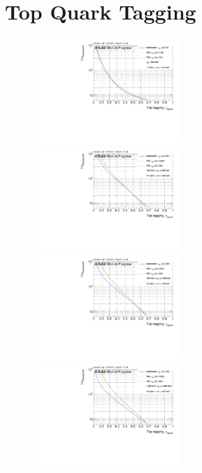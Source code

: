 \section{Top Quark Tagging}
\begin{figure}
\includegraphics[width=0.5\textwidth]{sascha_input/Appendix/Top_best/ROC_ALL_h_recoJet_nSub32_2_bin1.pdf} \hspace{1mm}
\includegraphics[width=0.5\textwidth]{sascha_input/Appendix/Top_best/ROC_ALL_h_recoJet_nSub32_2_bin2.pdf}
\bigskip
\includegraphics[width=0.5\textwidth]{sascha_input/Appendix/Top_best/ROC_ALL_h_recoJet_nSub32_2_bin3.pdf} \hspace{1mm}
\includegraphics[width=0.5\textwidth]{sascha_input/Appendix/Top_best/ROC_ALL_h_recoJet_nSub32_2_bin4.pdf}

\end{figure}
